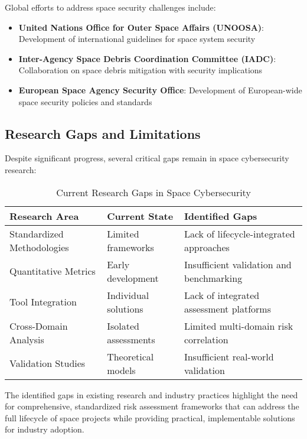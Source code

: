 \documentclass[binding=0.6cm]{sapthesis}
\begin{document}
Global efforts to address space security challenges include:

\begin{itemize}
    \item \textbf{United Nations Office for Outer Space Affairs (UNOOSA)}: Development of international guidelines for space system security
    \item \textbf{Inter-Agency Space Debris Coordination Committee (IADC)}: Collaboration on space debris mitigation with security implications
    \item \textbf{European Space Agency Security Office}: Development of European-wide space security policies and standards
\end{itemize}

\subsection{Research Gaps and Limitations}

Despite significant progress, several critical gaps remain in space cybersecurity research:

\begin{table}[H]
\centering
\caption{Current Research Gaps in Space Cybersecurity}
\begin{tabular}{|l|l|l|}
\hline
\textbf{Research Area} & \textbf{Current State} & \textbf{Identified Gaps} \\ \hline
Standardized Methodologies & Limited frameworks & Lack of lifecycle-integrated approaches \\ \hline
Quantitative Metrics & Early development & Insufficient validation and benchmarking \\ \hline
Tool Integration & Individual solutions & Lack of integrated assessment platforms \\ \hline
Cross-Domain Analysis & Isolated assessments & Limited multi-domain risk correlation \\ \hline
Validation Studies & Theoretical models & Insufficient real-world validation \\ \hline
\end{tabular}
\end{table}

The identified gaps in existing research and industry practices highlight the need for comprehensive, standardized risk assessment frameworks that can address the full lifecycle of space projects while providing practical, implementable solutions for industry adoption.
\end{document}

